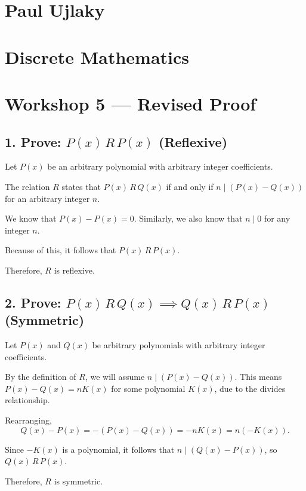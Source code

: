 \documentclass{article}
\begin{document}
\section*{\small Paul Ujlaky}\vspace{-1em}
\section*{\small Discrete Mathematics}

\section*{Workshop 5 --- Revised Proof}


\subsection*{1. Prove: $P(x) \, R \, P(x)$ (Reflexive)}

Let $P(x)$ be an arbitrary polynomial with arbitrary integer coefficients.

The relation $R$ states that $P(x) \, R \, Q(x)$ if and only if $n \mid (P(x) - Q(x))$ for an arbitrary integer $n$.

We know that $P(x) - P(x) = 0$. Similarly, we also know that $n \mid 0$ for any integer $n$. 

Because of this, it follows that $P(x) \, R \, P(x)$.

Therefore, $R$ is reflexive.


\subsection*{2. Prove: $P(x) \, R \, Q(x) \implies Q(x) \, R \, P(x)$ (Symmetric)}

Let $P(x)$ and $Q(x)$ be arbitrary polynomials with arbitrary integer coefficients.

By the definition of $R$, we will assume $n \mid (P(x) - Q(x))$. This means $P(x) - Q(x) = nK(x)$ for some polynomial $K(x)$, due to the divides relationship.

Rearranging, 
\[
Q(x) - P(x) = -(P(x) - Q(x)) = -nK(x) = n(-K(x)).
\]

Since $-K(x)$ is a polynomial, it follows that $n \mid (Q(x) - P(x))$, so $Q(x) \, R \, P(x)$.

Therefore, $R$ is symmetric.
\end{document}
